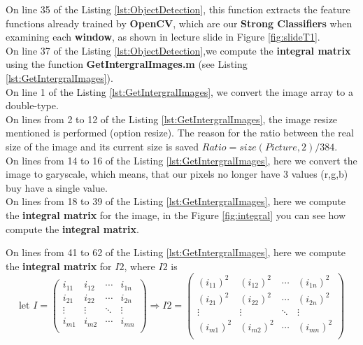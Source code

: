 \noindent On line 35 of the Listing \ref{lst:ObjectDetection}, this function extracts the feature functions already trained by \textbf{OpenCV}, which are our \textbf{Strong Classifiers} when examining each \textbf{window}, as shown in lecture slide in Figure \ref{fig:slideT1}.\\

\noindent On line 37 of the Listing \ref{lst:ObjectDetection},we compute the \textbf{integral matrix} using the function \textbf{GetIntergralImages.m} (see Listing \ref{lst:GetIntergralImages}).\\ 

\noindent On line 1 of the Listing \ref{lst:GetIntergralImages}, we convert the image array to a double-type.\\

\noindent On lines from 2 to 12 of the Listing \ref{lst:GetIntergralImages}, the image resize mentioned is performed (option resize). The reason for the ratio between the real size of the image and its current size is saved $Ratio=size(Picture,2)/384$.\\


\noindent On lines from 14 to 16 of the Listing \ref{lst:GetIntergralImages}, here we convert the image to garyscale, which means, that our pixels no longer have 3 values (r,g,b) buy have a single value.\\

\noindent On lines from 18 to 39 of the Listing \ref{lst:GetIntergralImages}, here we compute the \textbf{integral matrix} for the image, in the Figure \ref{fig:integral} you can see how compute the  \textbf{integral matrix}.

\noindent On lines from 41 to 62 of the Listing \ref{lst:GetIntergralImages}, here we compute the \textbf{integral matrix} for $I2$, where $I2$ is
\begin{equation}
	\text{let }	I=
	\begin{pmatrix}
		i_{11} & i_{12} & \cdots & i_{1n}\\
		i_{21} & i_{22} & \cdots & i_{2n}\\
		\vdots & \vdots & \ddots & \vdots\\
		i_{m1} & i_{m2} & \cdots & i_{mn}\\
	\end{pmatrix}
	\Rightarrow I2=
	\begin{pmatrix}
		(i_{11})^2 & (i_{12})^2 & \cdots & (i_{1n})^2\\
		(i_{21})^2 & (i_{22})^2 & \cdots & (i_{2n})^2\\
		\vdots & \vdots & \ddots & \vdots\\
		(i_{m1})^2 & (i_{m2})^2 & \cdots & (i_{mn})^{2}\\
	\end{pmatrix}
\end{equation}

